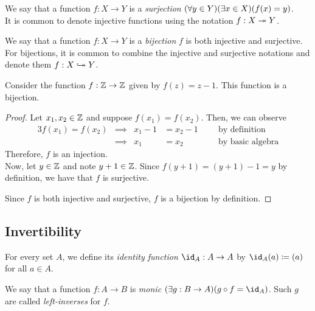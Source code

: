 \begin{definition}[Surjectivity]
    We say that a function $f: X \to Y$ is a \emph{surjection}
    \iffbydefn $\pn*{\forall y \in Y}\pn*{\exists x \in X}\pn*{f(x) = y}$.\\
    It is common to denote injective functions using the notation $f: X \twoheadrightarrow Y$.
\end{definition}

\begin{definition}[Bijectivity]
    We say that a function $f: X \to Y$ is a \emph{bijection}
    \iffbydefn $f$ is both injective and surjective.\\
    For bijections,
    it is common to combine the injective and surjective notations and denote them $f: X \bijection Y$.
\end{definition}

\begin{example}
    Consider the function $f: \mathbb{Z} \to \mathbb{Z}$ given by $f(z) = z - 1$.
    This function is a bijection.
\end{example}
\begin{proof}
    Let $x_1, x_2 \in \mathbb{Z}$ and suppose $f(x_1) = f(x_2)$.
    Then, we can observe
    \begin{alignat*}{3}
        f(x_1) = f(x_2) &\implies & x_1 - 1 &= x_2 - 1 &~~&\text{ by definition}\\
                        &\implies & x_1 &= x_2 &&\text{ by basic algebra}
    \end{alignat*}
    Therefore, $f$ is an injection.\\
    Now, let $y \in \mathbb{Z}$ and note $y + 1 \in \mathbb{Z}$.
    Since $f(y + 1) = (y + 1) - 1 = y$ by definition, we have that $f$ is surjective.

    Since $f$ is both injective and surjective, $f$ is a bijection by definition.
\end{proof}

\subsection{Invertibility}

\begin{definition}[Identity]
    For every set $A$, we define its \emph{identity function} $\id_A: A \to A$
    by $\id_A(a) \defn (a)$ for all $a \in A$.
\end{definition}

\begin{definition}[Monomorphisms]
    We say that a function $f: A \to B$ is \emph{monic} \iffbydefn
    $\pn*{\exists g: B \to A}\pn*{g \circ f = \id_{A}}$.
    Such $g$ are called \emph{left-inverses} for $f$.
\end{definition}

